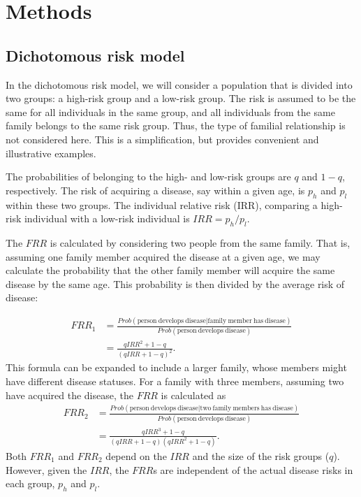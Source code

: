 \documentclass{bmcart}
\begin{document}
\section*{Methods}

\subsection*{Dichotomous risk model}
In the dichotomous risk model, we will consider a population that is divided into two groups: a high-risk group and a low-risk group. The risk is assumed to be the same for all individuals in the same group, and all individuals from the same family belongs to the same risk group. Thus, the type of familial relationship is not considered here. This is a simplification, but provides convenient and illustrative examples.

The probabilities of belonging to the high- and low-risk groups are $q$ and $1-q$, respectively. The risk of acquiring a disease, say within a given age, is $p_{h}$ and $p_{l}$ within these two groups. The individual relative risk (IRR), comparing a high-risk individual with a low-risk individual is $IRR = p_{h}/p_{l}$.

The $FRR$ is calculated by considering two people from the same family. That is, assuming one family member acquired the disease at a given age, we may calculate the probability that the other family member will acquire the same disease by the same age. This probability is then divided by the average risk of disease:

{\scriptsize
\begin{equation}
\begin{split}
FRR_1 &=\frac{Prob(\mathrm{person\ develops\ disease}|\mathrm{family\ member\ has\ disease})}{Prob(\mathrm{person\ develops\ disease})}\\ &=\frac{qIRR^2+1-q}{(qIRR+1-q)^2}.%
\end{split}
\label{FRR1}
\end{equation}
}
This formula can be expanded to include a larger family, whose members might have different disease statuses. For a family with three members, assuming two have acquired the disease, the $FRR$ is calculated as
{\scriptsize
\begin{equation}
\begin{split}
FRR_2 &=\frac{Prob(\mathrm{person\ develops\ disease}|\mathrm{two\ family\ members\ has\ disease})}{Prob(\mathrm{person\ develops\ disease})}\\ &=\frac{qIRR^3+1-q}{(qIRR+1-q)(qIRR^2+1-q)}.%
\end{split}
\label{FRR2}
\end{equation}
}
Both $FRR_1$ and $FRR_2$ depend on the $IRR$ and the size of the risk groups ($q$). However, given the $IRR$, the $FRR$s are independent of the actual disease risks in each group, $p_{h}$ and $p_{l}$.
\end{document}
